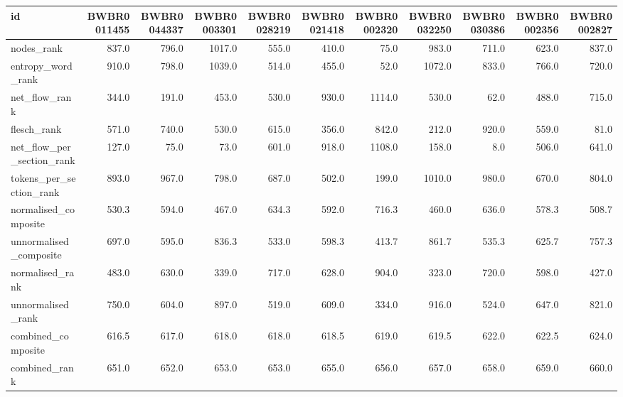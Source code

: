 \begin{tabular}{lrrrrrrrrrr}
\toprule
id & BWBR0011455 & BWBR0044337 & BWBR0003301 & BWBR0028219 & BWBR0021418 & BWBR0002320 & BWBR0032250 & BWBR0030386 & BWBR0002356 & BWBR0002827 \\
\midrule
nodes\_rank & 837.0 & 796.0 & 1017.0 & 555.0 & 410.0 & 75.0 & 983.0 & 711.0 & 623.0 & 837.0 \\
\cline{1-11}
entropy\_word\_rank & 910.0 & 798.0 & 1039.0 & 514.0 & 455.0 & 52.0 & 1072.0 & 833.0 & 766.0 & 720.0 \\
\cline{1-11}
net\_flow\_rank & 344.0 & 191.0 & 453.0 & 530.0 & 930.0 & 1114.0 & 530.0 & 62.0 & 488.0 & 715.0 \\
\cline{1-11}
flesch\_rank & 571.0 & 740.0 & 530.0 & 615.0 & 356.0 & 842.0 & 212.0 & 920.0 & 559.0 & 81.0 \\
\cline{1-11}
net\_flow\_per\_section\_rank & 127.0 & 75.0 & 73.0 & 601.0 & 918.0 & 1108.0 & 158.0 & 8.0 & 506.0 & 641.0 \\
\cline{1-11}
tokens\_per\_section\_rank & 893.0 & 967.0 & 798.0 & 687.0 & 502.0 & 199.0 & 1010.0 & 980.0 & 670.0 & 804.0 \\
\cline{1-11}
normalised\_composite & 530.3 & 594.0 & 467.0 & 634.3 & 592.0 & 716.3 & 460.0 & 636.0 & 578.3 & 508.7 \\
\cline{1-11}
unnormalised\_composite & 697.0 & 595.0 & 836.3 & 533.0 & 598.3 & 413.7 & 861.7 & 535.3 & 625.7 & 757.3 \\
\cline{1-11}
normalised\_rank & 483.0 & 630.0 & 339.0 & 717.0 & 628.0 & 904.0 & 323.0 & 720.0 & 598.0 & 427.0 \\
\cline{1-11}
unnormalised\_rank & 750.0 & 604.0 & 897.0 & 519.0 & 609.0 & 334.0 & 916.0 & 524.0 & 647.0 & 821.0 \\
\cline{1-11}
combined\_composite & 616.5 & 617.0 & 618.0 & 618.0 & 618.5 & 619.0 & 619.5 & 622.0 & 622.5 & 624.0 \\
\cline{1-11}
combined\_rank & 651.0 & 652.0 & 653.0 & 653.0 & 655.0 & 656.0 & 657.0 & 658.0 & 659.0 & 660.0 \\
\cline{1-11}
\bottomrule
\end{tabular}
